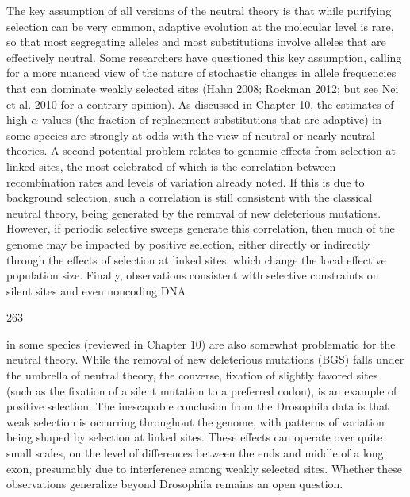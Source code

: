 \documentclass{article}
\begin{document}
The key assumption of all versions of the neutral theory is that while purifying selection can be very common, adaptive evolution at the molecular level is rare, so that most segregating alleles and most substitutions involve alleles that are effectively neutral. Some researchers have questioned this key assumption, calling for a more nuanced view of the nature of stochastic changes in allele frequencies that can dominate weakly selected sites (Hahn 2008; Rockman 2012; but see Nei et al. 2010 for a contrary opinion). As discussed in Chapter 10, the estimates of high  $ \alpha $ values (the fraction of replacement substitutions that are adaptive) in some species are strongly at odds with the view of neutral or nearly neutral theories. A second potential problem relates to genomic effects from selection at linked sites, the most celebrated of which is the correlation between recombination rates and levels of variation already noted. If this is due to background selection, such a correlation is still consistent with the classical neutral theory, being generated by the removal of new deleterious mutations. However, if periodic selective sweeps generate this correlation, then much of the genome may be impacted by positive selection, either directly or indirectly through the effects of selection at linked sites, which change the local effective population size. Finally, observations consistent with selective constraints on silent sites and even noncoding DNA

263

in some species (reviewed in Chapter 10) are also somewhat problematic for the neutral theory. While the removal of new deleterious mutations (BGS) falls under the umbrella of neutral theory, the converse, fixation of slightly favored sites (such as the fixation of a silent mutation to a preferred codon), is an example of positive selection. The inescapable conclusion from the Drosophila data is that weak selection is occurring throughout the genome, with patterns of variation being shaped by selection at linked sites. These effects can operate over quite small scales, on the level of differences between the ends and middle of a long exon, presumably due to interference among weakly selected sites. Whether these observations generalize beyond Drosophila remains an open question.
\end{document}
